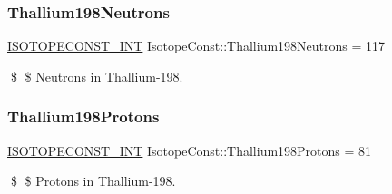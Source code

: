 \subsubsection{\texorpdfstring{Thallium198\+Neutrons}{Thallium198Neutrons}}
{\footnotesize\ttfamily \mbox{\hyperlink{group___isotope_const-_macros_ga5f18360b3e99483a35c32d789e62621c}{I\+S\+O\+T\+O\+P\+E\+C\+O\+N\+S\+T\+\_\+\+I\+NT}} Isotope\+Const\+::\+Thallium198\+Neutrons = 117}

\$ \$ Neutrons in Thallium-\/198. \mbox{\label{group___isotope_const-_thallium-_tl198_gac02464e36b3e0f8422f8c917e53c3702}} 
\subsubsection{\texorpdfstring{Thallium198\+Protons}{Thallium198Protons}}
{\footnotesize\ttfamily \mbox{\hyperlink{group___isotope_const-_macros_ga5f18360b3e99483a35c32d789e62621c}{I\+S\+O\+T\+O\+P\+E\+C\+O\+N\+S\+T\+\_\+\+I\+NT}} Isotope\+Const\+::\+Thallium198\+Protons = 81}

\$ \$ Protons in Thallium-\/198. 